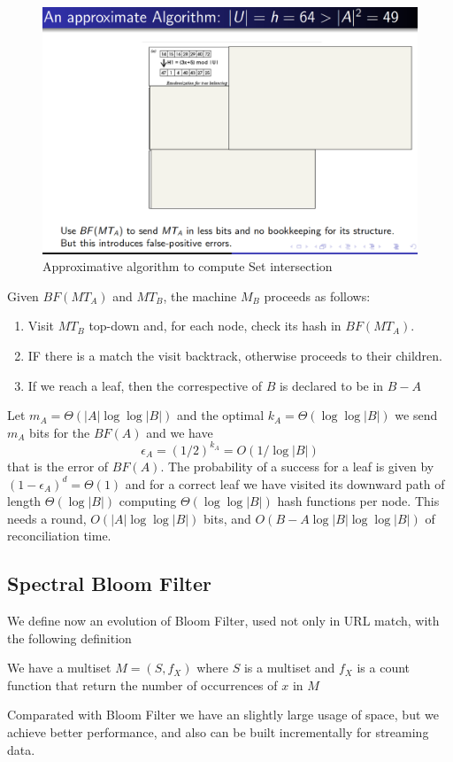 \begin{figure}
	\includegraphics[width=\textwidth]{Images/approximativeAlg}
	\caption{Approximative algorithm to compute Set intersection}
	\label{img:approximateAlg}
\end{figure}
Given $BF(MT_A)$ and $MT_B$, the machine $M_B$ proceeds as follows:
\begin{enumerate}
	\item Visit $MT_B$ top-down and, for each node, check its hash in $BF(MT_A)$.
	\item IF there is a match the visit backtrack, otherwise proceeds to their children.
	\item If we reach a leaf, then the correspective of $B$ is declared to be in $B - A$
\end{enumerate}
Let $m_A = \Theta(|A| \log \log |B|)$ and the optimal $k_A = \Theta(\log \log |B|)$ we send $m_A$ bits for the $BF(A)$ and we have
\[ \epsilon_A = (1/2)^{k_A} = O(1/ \log |B|) \] 
that is the error of $BF(A)$.\newline
The probability of a success for a leaf is given by $(1 - \epsilon_A)^d = \Theta(1)$ and for a correct leaf we have visited its downward path of length $\Theta(\log |B|)$ 
computing $\Theta(\log \log |B|)$ hash functions per node.\newline
This needs a round, $O(|A| \log \log |B|)$ bits, and $O(B - A \log |B| \log \log |B|)$ of reconciliation time.

\subsection{Spectral Bloom Filter}
    We define now an evolution of Bloom Filter, used not only in URL match, with the following definition
    \begin{defi}
         We have a multiset $M = (S, f_X)$ where $S$ is a multiset and $f_X$ is a count function that return the number of occurrences of $x$ in $M$
    \end{defi}
    Comparated with Bloom Filter we have an slightly large usage of space, but we achieve better performance, and also can be built incrementally for streaming data.

